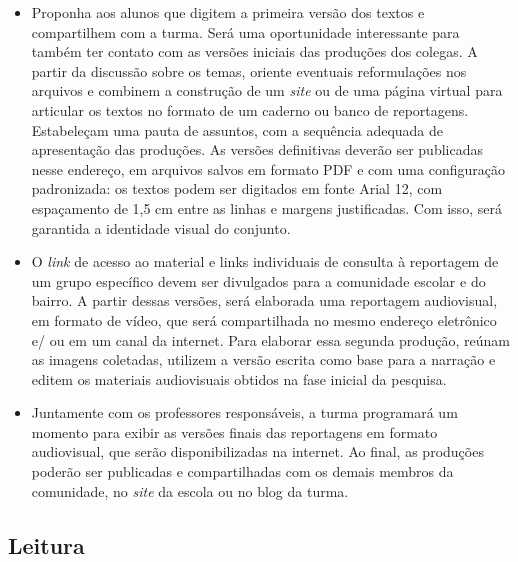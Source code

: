 \documentclass[11pt]{extarticle}
\begin{document}
\begin{itemize}
\item
  Proponha aos alunos que digitem a primeira versão dos textos e
  compartilhem com a turma. Será uma oportunidade interessante para
  também ter contato com as versões iniciais das produções dos colegas.
  A partir da discussão sobre os temas, oriente eventuais reformulações
  nos arquivos e combinem a construção de um \emph{site} ou de uma
  página virtual para articular os textos no formato de um caderno ou
  banco de reportagens. Estabeleçam uma pauta de assuntos, com a
  sequência adequada de apresentação das produções. As versões
  definitivas deverão ser publicadas nesse endereço, em arquivos salvos
  em formato PDF e com uma configuração padronizada: os textos podem ser
  digitados em fonte Arial 12, com espaçamento de 1,5 cm entre as linhas
  e margens justificadas. Com isso, será garantida a identidade visual
  do conjunto.
\item
  O \emph{link} de acesso ao material e links individuais de consulta à
  reportagem de um grupo específico devem ser divulgados para a
  comunidade escolar e do bairro. A partir dessas versões, será
  elaborada uma reportagem audiovisual, em formato de vídeo, que será
  compartilhada no mesmo endereço eletrônico e/ ou em um canal da
  internet. Para elaborar essa segunda produção, reúnam as imagens
  coletadas, utilizem a versão escrita como base para a narração e
  editem os materiais audiovisuais obtidos na fase inicial da pesquisa.
\item
  Juntamente com os professores responsáveis, a turma programará um
  momento para exibir as versões finais das reportagens em formato
  audiovisual, que serão disponibilizadas na internet. Ao final, as
  produções poderão ser publicadas e compartilhadas com os demais
  membros da comunidade, no \emph{site} da escola ou no blog da turma.
\end{itemize}

\subsection{Leitura}
\end{document}
